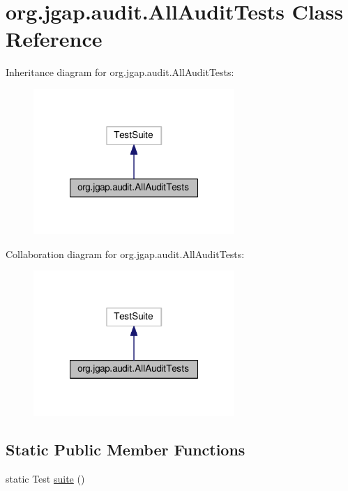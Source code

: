 \hypertarget{classorg_1_1jgap_1_1audit_1_1_all_audit_tests}{\section{org.\-jgap.\-audit.\-All\-Audit\-Tests Class Reference}
\label{classorg_1_1jgap_1_1audit_1_1_all_audit_tests}
}


Inheritance diagram for org.\-jgap.\-audit.\-All\-Audit\-Tests\-:
\nopagebreak
\begin{figure}[H]
\begin{center}
\leavevmode
\includegraphics[width=216pt]{classorg_1_1jgap_1_1audit_1_1_all_audit_tests__inherit__graph}
\end{center}
\end{figure}


Collaboration diagram for org.\-jgap.\-audit.\-All\-Audit\-Tests\-:
\nopagebreak
\begin{figure}[H]
\begin{center}
\leavevmode
\includegraphics[width=216pt]{classorg_1_1jgap_1_1audit_1_1_all_audit_tests__coll__graph}
\end{center}
\end{figure}
\subsection*{Static Public Member Functions}
\begin{DoxyCompactItemize}
\item 
static Test \hyperlink{classorg_1_1jgap_1_1audit_1_1_all_audit_tests_aacbe901447ee5930c8737397bbf13c46}{suite} ()
\end{DoxyCompactItemize}
